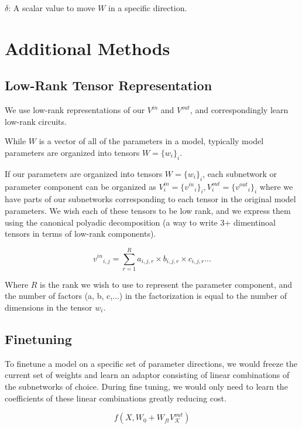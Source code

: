 \documentclass{article}
\theoremstyle{plain}
\theoremstyle{definition}
\theoremstyle{remark}
\begin{document}
$\delta$: A scalar value to move $W$ in a specific direction. 


\section{Additional Methods}

\subsection{Low-Rank Tensor Representation}\label{sec:low_rank}

We use low-rank representations of our $V^{in}$ and $V^{out}$, and correspondingly learn low-rank circuits.

While $W$ is a vector of all of the parameters in a model, typically model parameters are organized into tensors $W=\{w_i\}_i$. 

If our parameters are organized into tensors $W=\{w_i\}_i$, each subnetwork or parameter component can be organized as $V^{in}_i  = {\{{v^{in}}_i\}}_i, V^{out}_i = {\{{v^{out}}_i\}}_i$ where we have parts of our subnetworks corresponding to each tensor in the original model parameters. We wish each of these tensors to be low rank, and we express them using the canonical polyadic decomposition \cite{} (a way to write 3+ dimentinoal tensors in terms of low-rank components).

\begin{equation}
{v^{in}}_{i,j} = \sum_{r=1}^{R} a_{i,j,r} \times b_{i,j,r} \times c_{i,j,r} ...
\end{equation}

Where $R$ is the rank we wish to use to represent the parameter component, and the number of factors (a, b, c,...) in the factorization is equal to the number of dimensions in the tensor $w_i$.

\subsection{Finetuning}\label{sec:finetuning}

To finetune a model on a specific set of parameter directions, we would freeze the current set of weights and learn an adaptor consisting of linear combinations of the subnetworks of choice. During fine tuning, we would only need to learn the coefficients of these linear combinations greatly reducing cost.

\begin{equation}
    f(X, W_0 + W_{ft} V^{out}_\mathcal{K})
\end{equation}
\end{document}
